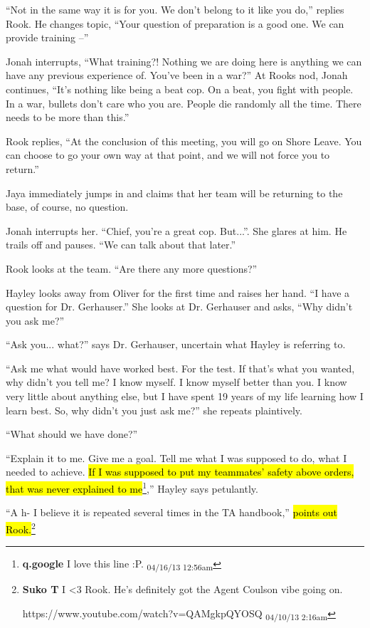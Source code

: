 ``Not in the same way it is for you.  We don't belong to it like you do,'' replies Rook.  He changes topic, ``Your question of preparation is a good one.  We can provide training --''



Jonah interrupts, ``What training?!  Nothing we are doing here is anything we can have any previous experience of.  You've been in a war?''  At Rooks nod, Jonah continues, ``It's nothing like being a beat cop.  On a beat, you fight with people.  In a war, bullets don't care who you are.  People die randomly all the time.  There needs to be more than this.''

Rook replies, ``At the conclusion of this meeting, you will go on Shore Leave.  You can choose to go your own way at that point, and we will not force you to return.''

Jaya immediately jumps in and claims that her team will be returning to the base, of course, no question.

Jonah interrupts her.  ``Chief, you're a great cop.  But...''.  She glares at him.  He trails off and pauses.  ``We can talk about that later.''



Rook looks at the team.  ``Are there any more questions?''

Hayley looks away from Oliver for the first time and raises her hand.  ``I have a question for Dr. Gerhauser.''  She looks at Dr. Gerhauser and asks, ``Why didn't you ask me?''

``Ask you... what?'' says Dr. Gerhauser, uncertain what Hayley is referring to.

``Ask me what would have worked best.   For the test.  If that's what you wanted, why didn't you tell me?  I know myself.  I know myself better than you.  I know very little about anything else, but I have spent 19 years of my life learning how I learn best.  So, why didn't you just ask me?'' she repeats plaintively.

``What should we have done?''

``Explain it to me.  Give me a goal.  Tell me what I was supposed to do, what I needed to achieve.  \hl{If I was supposed to put my teammates' safety above orders, that was never explained to me}\footnote{\textbf{q.google }I love this line :P. \textsubscript{04/16/13 12:56am}},'' Hayley says petulantly.  

``A h- I believe it is repeated several times in the TA handbook,'' \hl{points out Rook.}\footnote{\textbf{Suko T }I \textless 3 Rook.  He's definitely got the Agent Coulson vibe going on.

https://www.youtube.com/watch?v=QAMgkpQYOSQ \textsubscript{04/10/13 2:16am}}


